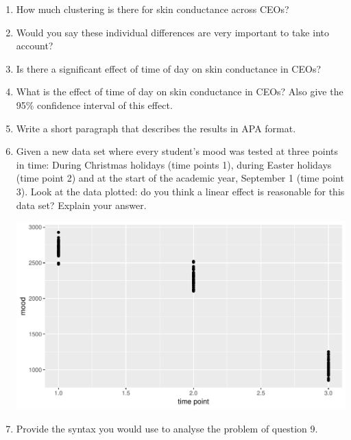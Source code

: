 \documentclass[]{report}\usepackage[]{graphicx}\usepackage[]{color}
\makeatletter
\def\maxwidth{ %
  \ifdim\Gin@nat@width>\linewidth
    \linewidth
  \else
    \Gin@nat@width
  \fi
}
\newenvironment{knitrout}{}{} %
\makeatother
\begin{document}
\begin{enumerate}
\item How much clustering is there for skin conductance across CEOs? \\
\item Would you say these individual differences are very important to take into account? \\
\item Is there a significant effect of time of day on skin conductance in CEOs?\\
\item What is the effect of time of day on skin conductance in CEOs? Also give the 95\% confidence interval of this effect.
\item Write a short paragraph that describes the results in APA format.
\item Given a new data set where every student's mood was tested at three points in time: During Christmas holidays (time points 1), during Easter holidays (time point 2) and at the start of the academic year, September 1 (time point 3). Look at the data plotted: do you think a linear effect is reasonable for this data set? Explain your answer.

\begin{knitrout}
\color{fgcolor}

{\centering \includegraphics[width=\maxwidth]{figure/analysispremidpost8-1} 

}



\end{knitrout}

\item Provide the syntax you would use to analyse the problem of question 9.


\end{enumerate}
\end{document}
